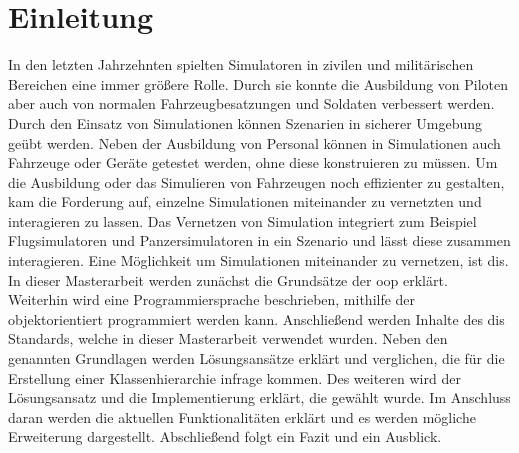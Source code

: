 \chapter{Einleitung}\label{Einleitung}
\onehalfspacing
In den letzten Jahrzehnten spielten Simulatoren in zivilen und militärischen Bereichen eine immer größere Rolle. Durch sie konnte die Ausbildung von Piloten aber auch von normalen Fahrzeugbesatzungen und Soldaten verbessert werden. Durch den Einsatz von Simulationen können Szenarien in sicherer Umgebung geübt werden. Neben der Ausbildung von Personal können in Simulationen auch Fahrzeuge oder Geräte getestet werden, ohne diese konstruieren zu müssen. 
Um die Ausbildung oder das Simulieren von Fahrzeugen noch effizienter zu gestalten, kam die Forderung auf, einzelne Simulationen miteinander zu vernetzten und interagieren zu lassen. Das Vernetzen von Simulation integriert zum Beispiel Flugsimulatoren und Panzersimulatoren in ein Szenario und lässt diese zusammen interagieren. 
Eine Möglichkeit um Simulationen miteinander zu vernetzen, ist \ac{dis}.\\
In dieser Masterarbeit werden zunächst die Grundsätze der \ac{oop} erklärt. Weiterhin wird eine Programmiersprache beschrieben, mithilfe der objektorientiert programmiert werden kann. Anschließend werden  Inhalte des \ac{dis} Standards, welche in dieser Masterarbeit verwendet wurden. Neben den genannten Grundlagen werden Lösungsansätze erklärt und verglichen, die für die Erstellung einer Klassenhierarchie infrage kommen. Des weiteren wird der Lösungsansatz und die Implementierung  erklärt, die gewählt wurde. Im Anschluss daran werden die aktuellen Funktionalitäten erklärt und es werden mögliche Erweiterung dargestellt. Abschließend folgt ein Fazit und ein Ausblick.  
       